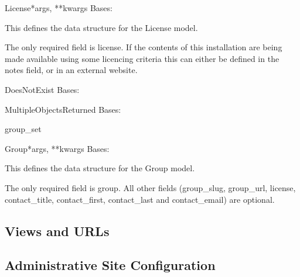 \documentclass[letterpaper,10pt,english]{sphinxmanual}
\begin{document}
\hypertarget{groups.models.License}{}\begin{classdesc}{License}{*args, **kwargs}
Bases: 

This defines the data structure for the License model.

The only required field is license.
If the contents of this installation are being made available using some licencing criteria this can either be defined in the notes field, or in an external website.

\hypertarget{groups.models.License.DoesNotExist}{}\begin{excdesc}{DoesNotExist}
Bases: 
\end{excdesc}

\hypertarget{groups.models.License.MultipleObjectsReturned}{}\begin{excdesc}{MultipleObjectsReturned}
Bases: 
\end{excdesc}

\hypertarget{groups.models.License.group\_set}{}\begin{memberdesc}[License]{group\_set}\end{memberdesc}
\end{classdesc}

\begin{classdesc}{Group}{*args, **kwargs}
Bases: 

This defines the data structure for the Group model.

The only required field is group.
All other fields (group\_slug, group\_url, license, contact\_title, contact\_first, contact\_last and contact\_email) are optional.
\end{classdesc}


\subsection{Views and URLs}
\hypertarget{module-groups.views}{}
\modulesynopsis{}

\subsection{Administrative Site Configuration}
\hypertarget{module-groups.admin}{}
\modulesynopsis{}
\end{document}
